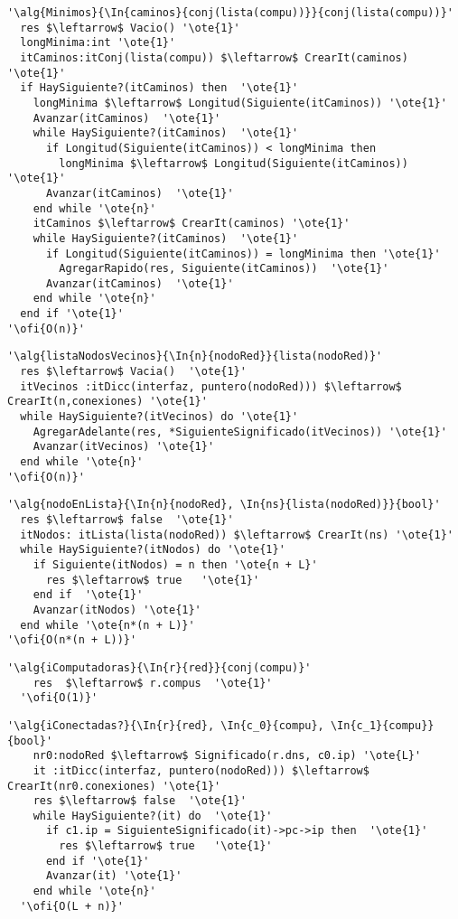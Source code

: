 \begin{lstlisting}[mathescape]
'\alg{Minimos}{\In{caminos}{conj(lista(compu))}}{conj(lista(compu))}'
  res $\leftarrow$ Vacio() '\ote{1}'
  longMinima:int '\ote{1}'
  itCaminos:itConj(lista(compu)) $\leftarrow$ CrearIt(caminos) '\ote{1}'
  if HaySiguiente?(itCaminos) then  '\ote{1}'
    longMinima $\leftarrow$ Longitud(Siguiente(itCaminos)) '\ote{1}'
    Avanzar(itCaminos)  '\ote{1}'
    while HaySiguiente?(itCaminos)  '\ote{1}'
      if Longitud(Siguiente(itCaminos)) < longMinima then
        longMinima $\leftarrow$ Longitud(Siguiente(itCaminos)) '\ote{1}'
      Avanzar(itCaminos)  '\ote{1}'
    end while '\ote{n}'
    itCaminos $\leftarrow$ CrearIt(caminos) '\ote{1}'
    while HaySiguiente?(itCaminos)  '\ote{1}'
      if Longitud(Siguiente(itCaminos)) = longMinima then '\ote{1}'
        AgregarRapido(res, Siguiente(itCaminos))  '\ote{1}'
      Avanzar(itCaminos)  '\ote{1}'
    end while '\ote{n}'
  end if '\ote{1}'
'\ofi{O(n)}'

\end{lstlisting}

\begin{lstlisting}[mathescape]
'\alg{listaNodosVecinos}{\In{n}{nodoRed}}{lista(nodoRed)}'
  res $\leftarrow$ Vacia()  '\ote{1}'
  itVecinos :itDicc(interfaz, puntero(nodoRed))) $\leftarrow$ CrearIt(n,conexiones) '\ote{1}'
  while HaySiguiente?(itVecinos) do '\ote{1}'
    AgregarAdelante(res, *SiguienteSignificado(itVecinos)) '\ote{1}'
    Avanzar(itVecinos) '\ote{1}'
  end while '\ote{n}'
'\ofi{O(n)}'
\end{lstlisting}

\begin{lstlisting}[mathescape]
'\alg{nodoEnLista}{\In{n}{nodoRed}, \In{ns}{lista(nodoRed)}}{bool}'
  res $\leftarrow$ false  '\ote{1}'
  itNodos: itLista(lista(nodoRed)) $\leftarrow$ CrearIt(ns) '\ote{1}'
  while HaySiguiente?(itNodos) do '\ote{1}'
    if Siguiente(itNodos) = n then '\ote{n + L}'
      res $\leftarrow$ true   '\ote{1}'
    end if  '\ote{1}'
    Avanzar(itNodos) '\ote{1}'
  end while '\ote{n*(n + L)}'
'\ofi{O(n*(n + L))}'
\end{lstlisting}


\begin{lstlisting}[mathescape]
'\alg{iComputadoras}{\In{r}{red}}{conj(compu)}'
    res  $\leftarrow$ r.compus  '\ote{1}'
  '\ofi{O(1)}'
\end{lstlisting}

\begin{lstlisting}[mathescape]
'\alg{iConectadas?}{\In{r}{red}, \In{c_0}{compu}, \In{c_1}{compu}}{bool}'
    nr0:nodoRed $\leftarrow$ Significado(r.dns, c0.ip) '\ote{L}'
    it :itDicc(interfaz, puntero(nodoRed))) $\leftarrow$ CrearIt(nr0.conexiones) '\ote{1}'
    res $\leftarrow$ false  '\ote{1}'
    while HaySiguiente?(it) do  '\ote{1}'
      if c1.ip = SiguienteSignificado(it)->pc->ip then  '\ote{1}'
        res $\leftarrow$ true   '\ote{1}'
      end if '\ote{1}'
      Avanzar(it) '\ote{1}'
    end while '\ote{n}'
  '\ofi{O(L + n)}'
\end{lstlisting}

